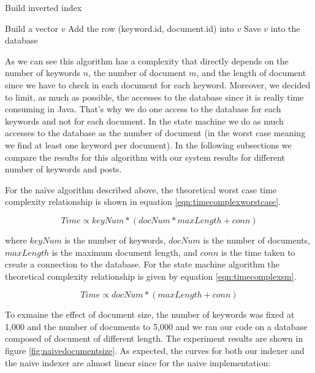 \documentclass[10pt]{article}
\begin{document}
\begin{algorithm}
\caption{Build inverted index}
\label{alg:invertedindex}
\begin{algorithmic}
  \STATE Build a vector $v$
  \STATE Add the row (keyword.id, document.id) into $v$
  \ENDFOR
  \STATE Save $v$ into the database
  \ENDFOR
\end{algorithmic}
\end{algorithm}

As we can see this algorithm has a complexity that directly depends on
the number of keywords $n$, the number of document $m$, and the length
of document since we have to check in each document for each
keyword. Moreover, we decided to limit, as much as possible, the
accesses to the database since it is really time consuming in
Java. That’s why we do one access to the database for each keywords
and not for each document. In the state machine we do as much accesses
to the database as the number of document (in the worst case meaning
we find at least one keyword per document). In the following
subsections we compare the results for this algorithm with our system
results for different number of keywords and posts.

For the na\"{i}ve algorithm described above, the theoretical worst
case time complexity relationship is shown in equation
\ref{eqn:timecomplexworstcase}.  

\begin{equation}
\label{eqn:timecomplexworstcase}
Time \propto keyNum * ( docNum * maxLength + conn)
\end{equation}

where \(keyNum\) is the number of keywords, \(docNum\) is the number
of documents, \(maxLength\) is the maximum document length, and
\(conn\) is the time taken to create a connection to the database. For
the state machine algorithm the theoretical complexity relationship is
given by equation \ref{eqn:timecomplexsm}.

\begin{equation}
\label{eqn:timecomplexsm}
Time \propto docNum * ( maxLength + conn)
\end{equation}

To exmaine the effect of document size, the number of keywords was
fixed at 1,000 and the number of documents to 5,000 and we ran our
code on a database composed of document of different length. The
experiment results are shown in figure \ref{fig:naivedocumentsize}. As
expected, the curves for both our indexer and the naive indexer are
almost linear since for the naive implementation: 
\end{document}
